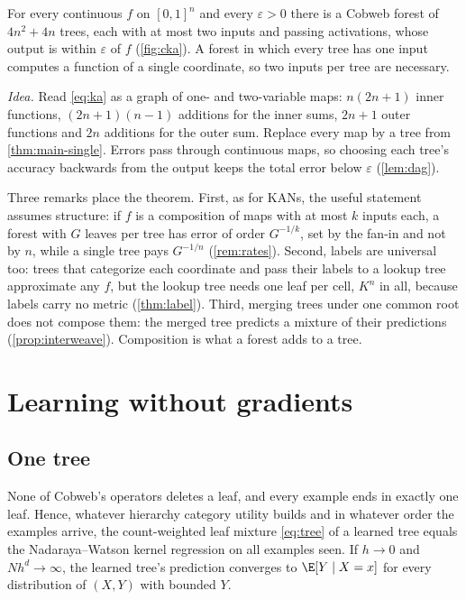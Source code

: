 \begin{theorem}\label{thm:main-cka}
For every continuous $f$ on $[0,1]^n$ and every $\varepsilon>0$ there is a Cobweb forest
of $4n^2+4n$ trees, each with at most two inputs and passing activations, whose output
is within $\varepsilon$ of $f$ (\cref{fig:cka}).  A forest in which every tree has one
input computes a function of a single coordinate, so two inputs per tree are necessary.
\end{theorem}

\emph{Idea.}  Read \eqref{eq:ka} as a graph of one- and two-variable maps:
$n(2n+1)$ inner functions, $(2n+1)(n-1)$ additions for the inner sums, $2n+1$ outer
functions and $2n$ additions for the outer sum.  Replace every map by a tree from
\cref{thm:main-single}.  Errors pass through continuous maps, so choosing each tree's
accuracy backwards from the output keeps the total error below $\varepsilon$
(\cref{lem:dag}).

Three remarks place the theorem.  First, as for KANs, the useful statement assumes
structure: if $f$ is a composition of maps with at most $k$ inputs each, a forest with
$G$ leaves per tree has error of order $G^{-1/k}$, set by the fan-in and not by $n$,
while a single tree pays $G^{-1/n}$ (\cref{rem:rates}).  Second, labels are universal
too: trees that categorize each coordinate and pass their labels to a lookup tree
approximate any $f$, but the lookup tree needs one leaf per cell, $K^n$ in all, because
labels carry no metric (\cref{thm:label}).  Third, merging trees under one common root
does not compose them: the merged tree predicts a mixture of their predictions
(\cref{prop:interweave}).  Composition is what a forest adds to a tree.

\section{Learning without gradients}\label{sec:learn-main}

\subsection{One tree}

\begin{theorem}\label{thm:main-learn}
None of Cobweb's operators deletes a leaf, and every example ends in exactly one leaf.
Hence, whatever hierarchy category utility builds and in whatever order the examples
arrive, the count-weighted leaf mixture \eqref{eq:tree} of a learned tree equals the
Nadaraya--Watson kernel regression on all examples seen.  If $h\to0$ and $Nh^d\to\infty$,
the learned tree's prediction converges to $\E[Y\mid X=x]$ for every distribution of
$(X,Y)$ with bounded $Y$.
\end{theorem}

